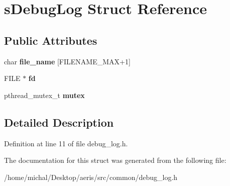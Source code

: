 \hypertarget{structsDebugLog}{\section{s\-Debug\-Log Struct Reference}
\label{structsDebugLog}
}
\subsection*{Public Attributes}
\begin{DoxyCompactItemize}
\item 
\hypertarget{structsDebugLog_a9241783d433fbe245355d7c802d256ca}{char {\bfseries file\-\_\-name} \mbox{[}F\-I\-L\-E\-N\-A\-M\-E\-\_\-\-M\-A\-X+1\mbox{]}}\label{structsDebugLog_a9241783d433fbe245355d7c802d256ca}

\item 
\hypertarget{structsDebugLog_a13963f4f51d07e60b0ded9d2931837a6}{F\-I\-L\-E $\ast$ {\bfseries fd}}\label{structsDebugLog_a13963f4f51d07e60b0ded9d2931837a6}

\item 
\hypertarget{structsDebugLog_adc7a9eff14d21090e2b4349bdd63072a}{pthread\-\_\-mutex\-\_\-t {\bfseries mutex}}\label{structsDebugLog_adc7a9eff14d21090e2b4349bdd63072a}

\end{DoxyCompactItemize}


\subsection{Detailed Description}


Definition at line 11 of file debug\-\_\-log.\-h.



The documentation for this struct was generated from the following file\-:\begin{DoxyCompactItemize}
\item 
/home/michal/\-Desktop/aeris/src/common/debug\-\_\-log.\-h\end{DoxyCompactItemize}
